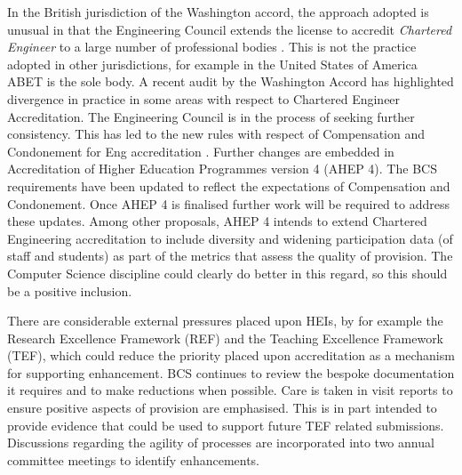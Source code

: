 \documentclass[sigconf]{acmart}
\begin{document}
In the British jurisdiction of the Washington accord, the approach adopted is unusual in that the Engineering Council extends the license to accredit \emph{Chartered Engineer} to a large number of professional bodies \cite{EC2019}. This is not the practice adopted in other jurisdictions, for example in the United States of America ABET is the sole body. A recent audit by the Washington Accord has highlighted divergence in practice in some areas with respect to Chartered Engineer Accreditation. The Engineering Council is in the process of seeking further consistency. This has led to the new rules with respect of Compensation and Condonement for Eng accreditation \cite{EC2018}. Further changes are embedded in Accreditation of Higher Education Programmes version 4 (AHEP 4). The BCS requirements have been updated to reflect the expectations of Compensation and Condonement. Once AHEP 4 is finalised further work will be required to address these updates. Among other proposals, AHEP 4 intends to extend Chartered Engineering accreditation to include diversity and widening participation data (of staff and students) as part of the metrics that assess the quality of provision. The Computer Science discipline could clearly do better in this regard, so this should be a positive inclusion.

There are considerable external pressures placed upon HEIs, by for example the Research Excellence Framework (REF) and the Teaching Excellence Framework (TEF), which could reduce the priority placed upon accreditation as a mechanism for supporting enhancement. BCS continues to review the bespoke documentation it requires and to make reductions when possible. Care is taken in visit reports to ensure positive aspects of provision are emphasised. This is in part intended to provide evidence that could be used to support future TEF related submissions. Discussions regarding the agility of processes are incorporated into two annual committee meetings to identify enhancements. 
\end{document}
